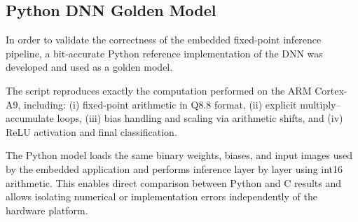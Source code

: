\subsection{Python DNN Golden Model}
\label{sec:appendix_dnn_golden}

In order to validate the correctness of the embedded fixed-point inference
pipeline, a bit-accurate Python reference implementation of the DNN was
developed and used as a golden model.

The script reproduces exactly the computation performed on the ARM Cortex-A9,
including:
(i) fixed-point arithmetic in Q8.8 format,
(ii) explicit multiply–accumulate loops,
(iii) bias handling and scaling via arithmetic shifts,
and (iv) ReLU activation and final classification.

The Python model loads the same binary weights, biases, and input images used
by the embedded application and performs inference layer by layer using
int16 arithmetic.
This enables direct comparison between Python and C results and allows
isolating numerical or implementation errors independently of the hardware
platform.


